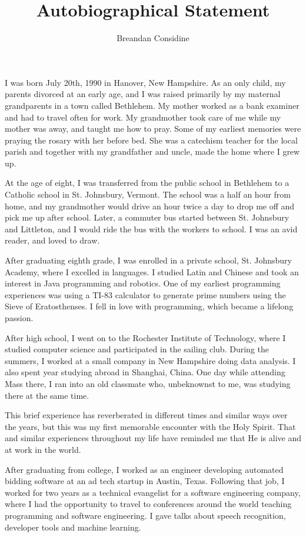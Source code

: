 \documentclass[11pt]{article}
\title{Autobiographical Statement}
\author{Breandan Considine}
\begin{document}
\maketitle
I was born July 20th, 1990 in Hanover, New Hampshire. As an only child, my parents divorced at an early age, and I was raised primarily by my maternal grandparents in a town called Bethlehem. My mother worked as a bank examiner and had to travel often for work. My grandmother took care of me while my mother was away, and taught me how to pray. Some of my earliest memories were praying the rosary with her before bed. She was a catechism teacher for the local parish and together with my grandfather and uncle, made the home where I grew up.

At the age of eight, I was transferred from the public school in Bethlehem to a Catholic school in St. Johnsbury, Vermont. The school was a half an hour from home, and my grandmother would drive an hour twice a day to drop me off and pick me up after school. Later, a commuter bus started between St. Johnsbury and Littleton, and I would ride the bus with the workers to school. I was an avid reader, and loved to draw.

After graduating eighth grade, I was enrolled in a private school, St. Johnsbury Academy, where I excelled in languages. I studied Latin and Chinese and took an interest in Java programming and robotics. One of my earliest programming experiences was using a TI-83 calculator to generate prime numbers using the Sieve of Eratosthenses. I fell in love with programming, which became a lifelong passion.

After high school, I went on to the Rochester Institute of Technology, where I studied computer science and participated in the sailing club. During the summers, I worked at a small company in New Hampshire doing data analysis. I also spent year studying abroad in Shanghai, China. One day while attending Mass there, I ran into an old classmate who, unbeknownst to me, was studying there at the same time.

This brief experience has reverberated in different times and similar ways over the years, but this was my first memorable encounter with the Holy Spirit. That and similar experiences throughout my life have reminded me that He is alive and at work in the world.

After graduating from college, I worked as an engineer developing automated bidding software at an ad tech startup in Austin, Texas. Following that job, I worked for two years as a technical evangelist for a software engineering company, where I had the opportunity to travel to conferences around the world teaching programming and software engineering. I gave talks about speech recognition, developer tools and machine learning.
\end{document}
